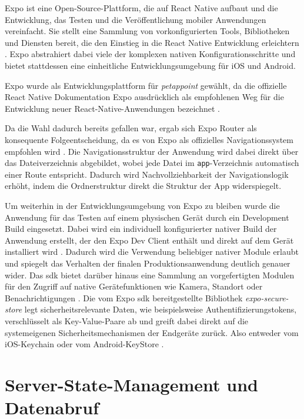 Expo ist eine Open-Source-Plattform, die auf React Native aufbaut und die Entwicklung, das Testen und die Veröffentlichung mobiler Anwendungen vereinfacht. Sie stellt eine Sammlung von vorkonfigurierten Tools, Bibliotheken und Diensten bereit, die den Einstieg in die React Native Entwicklung erleichtern \cite{expo-docs}. Expo abstrahiert dabei viele der komplexen nativen Konfigurationsschritte und bietet stattdessen eine einheitliche Entwicklungsumgebung für iOS und Android.

Expo wurde als Entwicklungsplattform für \textit{petappoint} gewählt, da die offizielle React Native Dokumentation Expo ausdrücklich als empfohlenen Weg für die Entwicklung neuer React-Native-Anwendungen bezeichnet \cite{react-native-docs}. 

Da die Wahl dadurch bereits gefallen war, ergab sich Expo Router als konsequente Folgeentscheidung, 
da es von Expo als offizielles Navigationssystem empfohlen wird \cite{expo-router}. Die Navigationsstruktur der Anwendung wird dabei direkt über das Dateiverzeichnis abgebildet, wobei jede Datei im \texttt{app}-Verzeichnis automatisch einer Route entspricht. Dadurch wird Nachvollziehbarkeit der Navigationslogik erhöht, indem die Ordnerstruktur direkt die Struktur der App widerspiegelt. 

Um weiterhin in der Entwicklungsumgebung von Expo zu bleiben wurde die Anwendung für das Testen auf einem physischen Gerät durch ein Development Build eingesetzt. Dabei wird ein individuell konfigurierter nativer Build der Anwendung erstellt, der den Expo Dev Client enthält und direkt auf dem Gerät installiert wird \cite{expo-build}. Dadurch wird die Verwendung beliebiger nativer Module erlaubt und spiegelt das Verhalten der finalen Produktionsanwendung deutlich genauer wider. Das \gls{sdk} bietet darüber hinaus eine Sammlung an vorgefertigten Modulen für den Zugriff auf native  Gerätefunktionen wie Kamera, Standort oder Benachrichtigungen \cite{expo-build}. Die vom Expo \gls{sdk} bereitgestellte Bibliothek \textit{expo-secure-store} legt sicherheitsrelevante Daten, wie 
beispielsweise Authentifizierungstokens, verschlüsselt als Key-Value-Paare ab und greift dabei direkt auf die systemeigenen Sicherheitsmechanismen der Endgeräte zurück. Also entweder vom iOS-Keychain oder vom Android-KeyStore \cite{expo-service}.



\section{Server-State-Management und Datenabruf}

